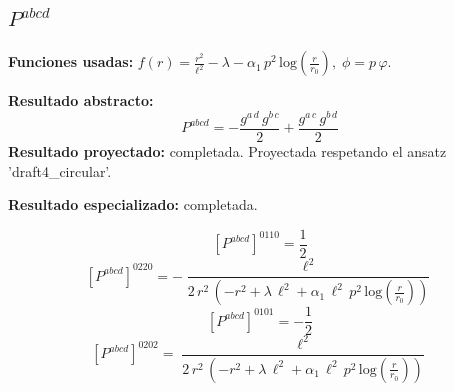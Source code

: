\documentclass[11pt]{article}
\begin{document}
\subsection*{$ P^{abcd} $}
\textbf{Funciones usadas:} $ f\!\left(r\right) = \frac{{r}^{2}}{{\ell}^{2}} - \lambda - \alpha_{1}\,{p}^{2}\,\mathrm{log}\!\left(\frac{r}{r_{0}}\right),\;\phi=p\,\varphi $.\par
\textbf{Resultado abstracto:}
\begin{dmath*}[breakdepth={5}]
P^{abcd} = -\frac{g{}^{a\,d}\,g{}^{b\,c}}{2} + \frac{g{}^{a\,c}\,g{}^{b\,d}}{2}
\end{dmath*}
\textbf{Resultado proyectado:} completada. Proyectada respetando el ansatz 'draft4\_circular'.\par
\textbf{Resultado especializado:} completada.\par
\begin{dmath*}[breakdepth={5}]
\left[P^{abcd}\right]^{0110} = \frac{1}{2}
\end{dmath*}
\begin{dmath*}[breakdepth={5}]
\left[P^{abcd}\right]^{0220} = -\frac{{\ell}^{2}}{2\,{r}^{2}\,\left(-{r}^{2} + \lambda\,{\ell}^{2} + \alpha_{1}\,{\ell}^{2}\,{p}^{2}\,\mathrm{log}\!\left(\frac{r}{r_{0}}\right)\right)}
\end{dmath*}
\begin{dmath*}[breakdepth={5}]
\left[P^{abcd}\right]^{0101} = -\frac{1}{2}
\end{dmath*}
\begin{dmath*}[breakdepth={5}]
\left[P^{abcd}\right]^{0202} = \frac{{\ell}^{2}}{2\,{r}^{2}\,\left(-{r}^{2} + \lambda\,{\ell}^{2} + \alpha_{1}\,{\ell}^{2}\,{p}^{2}\,\mathrm{log}\!\left(\frac{r}{r_{0}}\right)\right)}
\end{dmath*}
\end{document}
